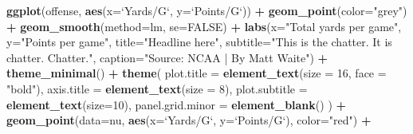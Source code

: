 \documentclass[
]{book}
\newenvironment{Shaded}{\begin{snugshade}}{\end{snugshade}}
\newcommand{\DataTypeTok}[1]{\textcolor[rgb]{0.13,0.29,0.53}{#1}}
\newcommand{\DecValTok}[1]{\textcolor[rgb]{0.00,0.00,0.81}{#1}}
\newcommand{\KeywordTok}[1]{\textcolor[rgb]{0.13,0.29,0.53}{\textbf{#1}}}
\newcommand{\NormalTok}[1]{#1}
\newcommand{\OperatorTok}[1]{\textcolor[rgb]{0.81,0.36,0.00}{\textbf{#1}}}
\newcommand{\OtherTok}[1]{\textcolor[rgb]{0.56,0.35,0.01}{#1}}
\newcommand{\StringTok}[1]{\textcolor[rgb]{0.31,0.60,0.02}{#1}}
\begin{document}
\begin{Shaded}
\end{Shaded}

\begin{Shaded}
\begin{Highlighting}[]
\KeywordTok{ggplot}\NormalTok{(offense, }\KeywordTok{aes}\NormalTok{(}\DataTypeTok{x=}\StringTok{`}\DataTypeTok{Yards/G}\StringTok{`}\NormalTok{, }\DataTypeTok{y=}\StringTok{`}\DataTypeTok{Points/G}\StringTok{`}\NormalTok{)) }\OperatorTok{+}\StringTok{ }
\StringTok{  }\KeywordTok{geom_point}\NormalTok{(}\DataTypeTok{color=}\StringTok{"grey"}\NormalTok{) }\OperatorTok{+}\StringTok{ }\KeywordTok{geom_smooth}\NormalTok{(}\DataTypeTok{method=}\NormalTok{lm, }\DataTypeTok{se=}\OtherTok{FALSE}\NormalTok{) }\OperatorTok{+}\StringTok{ }
\StringTok{  }\KeywordTok{labs}\NormalTok{(}\DataTypeTok{x=}\StringTok{"Total yards per game"}\NormalTok{, }\DataTypeTok{y=}\StringTok{"Points per game"}\NormalTok{, }\DataTypeTok{title=}\StringTok{"Headline here"}\NormalTok{, }\DataTypeTok{subtitle=}\StringTok{"This is the chatter. It is chatter. Chatter."}\NormalTok{, }\DataTypeTok{caption=}\StringTok{"Source: NCAA | By Matt Waite"}\NormalTok{) }\OperatorTok{+}\StringTok{ }
\StringTok{  }\KeywordTok{theme_minimal}\NormalTok{() }\OperatorTok{+}\StringTok{ }
\StringTok{  }\KeywordTok{theme}\NormalTok{(}
    \DataTypeTok{plot.title =} \KeywordTok{element_text}\NormalTok{(}\DataTypeTok{size =} \DecValTok{16}\NormalTok{, }\DataTypeTok{face =} \StringTok{"bold"}\NormalTok{),}
    \DataTypeTok{axis.title =} \KeywordTok{element_text}\NormalTok{(}\DataTypeTok{size =} \DecValTok{8}\NormalTok{), }
    \DataTypeTok{plot.subtitle =} \KeywordTok{element_text}\NormalTok{(}\DataTypeTok{size=}\DecValTok{10}\NormalTok{), }
    \DataTypeTok{panel.grid.minor =} \KeywordTok{element_blank}\NormalTok{()}
\NormalTok{    ) }\OperatorTok{+}
\StringTok{  }\KeywordTok{geom_point}\NormalTok{(}\DataTypeTok{data=}\NormalTok{nu, }\KeywordTok{aes}\NormalTok{(}\DataTypeTok{x=}\StringTok{`}\DataTypeTok{Yards/G}\StringTok{`}\NormalTok{, }\DataTypeTok{y=}\StringTok{`}\DataTypeTok{Points/G}\StringTok{`}\NormalTok{), }\DataTypeTok{color=}\StringTok{"red"}\NormalTok{) }\OperatorTok{+}\StringTok{ }

\end{Highlighting}
\end{Shaded}
\end{document}
